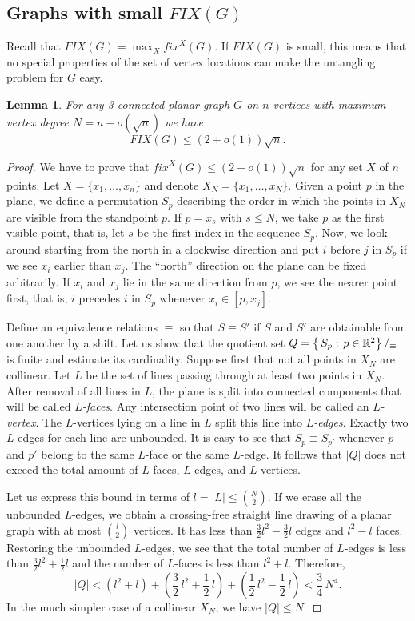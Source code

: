 \documentclass[reqno,12pt]{amsart}
\newtheorem{lemma}[theorem]{Lemma}
\newcommand{\reals}{\mathbb{R}}
\newcommand{\of}[1]{\left( #1 \right)}
\newcommand{\setdef}[2]{\left\{ \hspace{0.5mm} #1 : \hspace{0.5mm} #2 \right\}}
\newcommand{\fixx}[1]{\mathit{fix}^X(#1)}
\newcommand{\FIX}[1]{\mathit{FIX}(#1)}
\begin{document}
\subsection{Graphs with small $\FIX G$}\label{ss:FIX}

Recall that $\FIX G=\max_X\fixx G$.
If $\FIX G$ is small, this means that no special properties of the set
of vertex locations can make the untangling problem for $G$ easy.

\begin{lemma}\label{lem:fixx}
For any 3-connected planar graph $G$ on $n$ vertices with maximum
vertex degree $N=n-o(\sqrt n)$ we have
$$
\FIX G\le(2+o(1))\sqrt n.
$$
\end{lemma}

\begin{proof}
We have to prove that $\fixx G\le(2+o(1))\sqrt n$ for any set $X$ of $n$ points.
Let $X=\{x_1,\ldots,x_n\}$ and denote $X_N=\{x_1,\ldots,x_N\}$.
Given a point $p$ in the plane, we define a permutation 
$S_p$ describing the order in which the points in $X_N$ are visible from the 
standpoint $p$. 
If $p=x_s$ with $s\le N$, we take $p$ as the first visible point, that is,
let $s$ be the first index in the sequence $S_p$. Now, we look around starting
from the north in a clockwise direction and put $i$ before $j$ in $S_p$
if we see $x_i$ earlier than $x_j$. The ``north'' direction on the plane can be fixed 
arbitrarily. If $x_i$ and $x_j$ lie in the same direction from $p$,
we see the nearer point first, that is, $i$ precedes $i$ in $S_p$
whenever $x_i\in[p,x_j]$.

Define an equivalence relations $\equiv$ so that $S\equiv S'$ if $S$ and $S'$
are obtainable from one another by a shift.
Let us show that the quotient set $Q=\setdef{S_p}{p\in\reals^2}/_\equiv$ is finite and estimate its cardinality.
Suppose first that not all points in $X_N$ are collinear.
Let $L$ be the set of lines passing through at least
two points in $X_N$. After removal of all lines in $L$, the plane
is split into connected components that will be called \emph{$L$-faces}.
Any intersection point of two lines will be called an \emph{$L$-vertex}.
The $L$-vertices lying on a line in $L$ split this line into \emph{$L$-edges}.
Exactly two $L$-edges for each line are unbounded.
It is easy to see that $S_p\equiv S_{p'}$ whenever $p$ and $p'$ belong to the same
$L$-face or the same $L$-edge. It follows that $|Q|$
does not exceed the total amount of $L$-faces, $L$-edges, and $L$-vertices.

Let us express this bound in terms of $l=|L|\le{N\choose2}$. If we erase
all the unbounded $L$-edges, we obtain a crossing-free straight line drawing of
a planar graph with at most ${l\choose2}$ vertices. It has less than
$\frac32l^2-\frac32l$ edges and $l^2-l$ faces. Restoring the unbounded
$L$-edges, we see that the total number of $L$-edges is less than $\frac32l^2+\frac12l$  
and the number of $L$-faces is less than $l^2+l$. Therefore,
$$
|Q|<(l^2+l)+\of{\frac32\,l^2+\frac12\,l}+\of{\frac12\,l^2-\frac12\,l}<\frac34\,N^4.
$$
In the much simpler case of a collinear $X_N$, we have $|Q|\le N$.



\end{proof}
\end{document}
